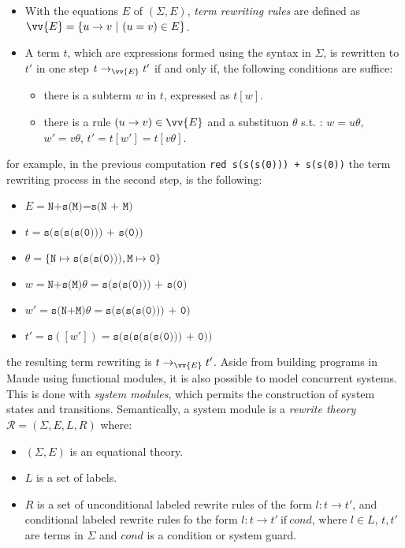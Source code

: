 \begin{itemize}
    \item With the equations $E$ of $(\Sigma, E)$, \textit{term rewriting rules} are defined as $\vv{E} = \{u \rightarrow v  \ | \ (u = v) \in E \}$. 
    \item A term $t$, which are expressions formed using the syntax in $\Sigma$, is rewritten to $t'$ in one step $t \rightarrow_{\vv{E}} t'$ if and only if, the following conditions are suffice:
        \begin{itemize}
            \item there is a subterm $w$ in $t$, expressed as $t[w]$.
            \item there is a rule $(u \rightarrow v) \in \vv{E}$ and a substituon $\theta$ s.t. : $w = u\theta$, $w' = v\theta$, $t'=t[w']=t[v\theta]$.   
        \end{itemize}
\end{itemize}
for example, in the previous computation \texttt{red s(s(s(0))) + s(s(0))} the term rewriting process in the second step, is the following:
\begin{itemize}
    \item $E = \texttt{N+s(M)=s(N + M)}$
    \item $t = \texttt{s(s(s(s(0))) + s(0))}$
    \item $\theta = \{\texttt{N} \mapsto \texttt{s(s(s(0)))},\texttt{M} \mapsto \texttt{0} \}$
    \item $w = \texttt{N+s(M)}\theta = \texttt{s(s(s(0))) + s(0)}$
    \item $w' = \texttt{s(N+M)}\theta = \texttt{s(s(s(s(0))) + 0)}$
    \item $t' = \texttt{s}([w']) = \texttt{s(s(s(s(s(0))) + 0))}$
\end{itemize}
the resulting term rewriting is $t \rightarrow_{\vv{E}} t'$.
Aside from building programs in Maude using functional modules, it is also possible to model concurrent systems. This is done with \textit{system modules}, which permits the construction of system states and transitions. Semantically, a system module is a \textit{rewrite theory} $\mathscr{R} = (\Sigma, E, L, R)$ where: 
\begin{itemize}
    \item $(\Sigma, E)$ is an equational theory.
    \item $L$ is a set of labels.
    \item $R$ is a set of unconditional labeled rewrite rules of the form $l: t \rightarrow t'$, and conditional labeled rewrite rules fo the form $l: t \rightarrow t' \ \text{if} \ cond$, where $l \in L$, $t,t'$ are terms in $\Sigma$ and $cond$ is a condition or system guard.    
\end{itemize}
